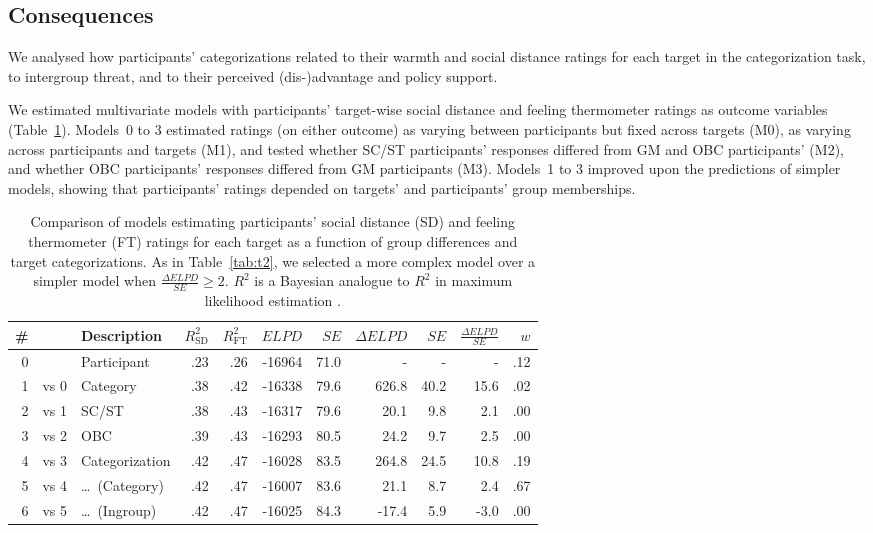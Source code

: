 \documentclass[12pt, a4paper]{article}
\begin{document}
\subsection{Consequences}

We analysed how participants' categorizations related to their warmth and social distance ratings for each target in the categorization task, to intergroup threat, and to their perceived (dis-)advantage and policy support.

We estimated multivariate models with participants' target-wise social distance and feeling thermometer ratings as outcome variables (Table~\ref{tab:t3}). Models~0 to 3 estimated ratings (on either outcome) as varying between participants but fixed across targets (M0), as varying across participants and targets (M1), and tested whether SC/ST participants' responses differed from GM and OBC participants' (M2), and whether OBC participants' responses differed from GM participants (M3). Models~1 to 3 improved upon the predictions of simpler models, showing that participants' ratings depended on targets' and participants' group memberships.

\begin{table}
\caption{Comparison of models estimating participants' social distance (SD) and feeling thermometer (FT) ratings for each target as a function of group differences and target categorizations. As in Table~\ref{tab:t2}, we selected a more complex model over a simpler model when $\frac{\Delta\textit{ELPD}}{\textit{SE}} \geq 2$. $R^2$ is a Bayesian analogue to $R^2$ in maximum likelihood estimation \protect{}.}
\centering
{}
\small	
\begin{tabularx}{\linewidth}{r@{~}rXrrrrrrrr} \toprule
\# &  & Description & $R^2_\text{SD}$ & $R^2_\text{FT}$ & $\textit{ELPD}$ & $\textit{SE}$ & $\Delta\textit{ELPD}$ & $\textit{SE}$ & $\frac{\Delta\textit{ELPD}}{\textit{SE}}$ & $w$ \\ \midrule 
0 &      & Participant & .23 & .26 & -16964 & 71.0 & - & - & - & .12 \\
1 & vs 0 & Category & .38 & .42 & -16338 & 79.6 & 626.8 & 40.2 & 15.6 & .02 \\
2 & vs 1 & SC/ST    & .38 & .43 & -16317 & 79.6 &  20.1 &  9.8 &  2.1 & .00 \\
3 & vs 2 & OBC      & .39 & .43 & -16293 & 80.5 &  24.2 &  9.7 &  2.5 & .00 \\ \midrule
4 & vs 3 & Categorization    & .42 & .47 & -16028 & 83.5 & 264.8 & 24.5 & 10.8 & .19 \\
5 & vs 4 & \ldots~(Category) & .42 & .47 & -16007 & 83.6 &  21.1 &  8.7 &  2.4 & .67 \\
6 & vs 5 & \ldots~(Ingroup)  & .42 & .47 & -16025 & 84.3 & -17.4 &  5.9 & -3.0 & .00 \\
\bottomrule    
\end{tabularx}
\label{tab:t3}
\end{table}
\end{document}
